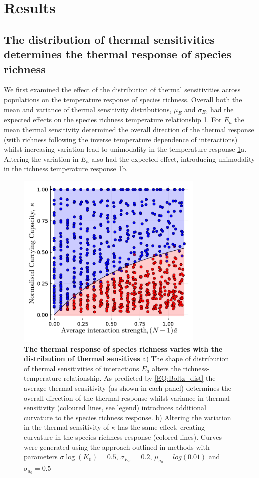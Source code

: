 \documentclass{article}
\begin{document}
\section*{Results}

\subsection*{The distribution of thermal sensitivities determines the thermal response of species richness}

We first examined the effect of the distribution of thermal sensitivities across populations on the temperature response of species richness. Overall both the mean and variance of thermal sensitivity distributions, $\mu_E$ and $\sigma_E$, had the expected effects on the species richness temperature relationship \cref{Fig:N_vs_T}. For $E_a$ the mean thermal sensitivity determined the overall direction of the thermal response (with richness following the inverse temperature dependence of interactions) whilst increasing variation lead to unimodality in the temperature response \cref{Fig:N_vs_T}a. Altering the variation in $E_{\kappa}$ also had the expected effect, introducing unimodality in the richness temperature response \cref{Fig:N_vs_T}b. 

\begin{figure}[h!] 
    \centering
    \includegraphics[width=0.8\textwidth]{docs/Figures/Fig_1.pdf} 
    \caption{\textbf{The thermal response of species richness  varies with the distribution of thermal sensitives} a) The shape of distribution of thermal sensitivities of interactions $E_a$ alters the richness-temperature relationship. As predicted by \cref{EQ:Boltz_dist} the average thermal sensitivity (as shown in each panel) determines the overall direction of the thermal response whilst variance in thermal sensitivity (coloured lines, see legend) introduces additional curvature to the species richness response. b) Altering the variation in the thermal sensitivity of $\kappa$ has the same effect, creating curvature in  the species richness response (colored lines). Curves were generated using the approach outlined in methods with parameters $\sigma{\log(K_0)} = 0.5$, $\sigma_{E_K} = 0.2$, $\mu_{a_0} = log(0.01)$ and  $\sigma_{a_0} = 0.5$}
    \label{Fig:N_vs_T}
\end{figure}
\end{document}
